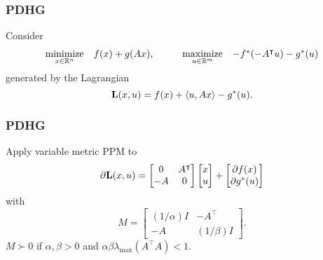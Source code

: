 \documentclass[10pt,mathserif]{beamer}
\begin{document}
\begin{frame}[label=frame_pdhg1]
\frametitle{PDHG}
Consider 
\[
\begin{array}{ll}
\underset{x\in \mathbb{R}^n}{\mbox{minimize}}&f(x)+g(Ax),
\end{array}
\qquad
\begin{array}{ll}
\underset{ u  \in \mathbb{R}^m}{\mbox{maximize}}&-f^*(-A^\intercal u )-g^*( u )
\end{array}
\]
generated by the Lagrangian %
\[
\mathbf{L}(x, u )=f(x)+\langle  u , Ax\rangle-g^*( u ).
\]
\end{frame}

\begin{frame}[label=frame_pdhg2]
\frametitle{PDHG}
Apply variable metric PPM to
\[
\partial \mathbf{L}(x, u )
=
\begin{bmatrix}
0&A^\intercal\\
-A&0
\end{bmatrix}
\begin{bmatrix}
x\\
 u 
\end{bmatrix}
+
\begin{bmatrix}
\partial f(x)\\
\partial g^*( u )
\end{bmatrix}
\]
with
\[
M=
\begin{bmatrix}
(1/\alpha) I &-A^\intercal\\
-A &(1/\beta) I
\end{bmatrix}.
\]
 $M\succ 0$ if $\alpha,\beta>0$ and $\alpha\beta\lambda_\mathrm{max}(A^\intercal A)<1$.
\vspace{0.2in}



\end{frame}
\end{document}
